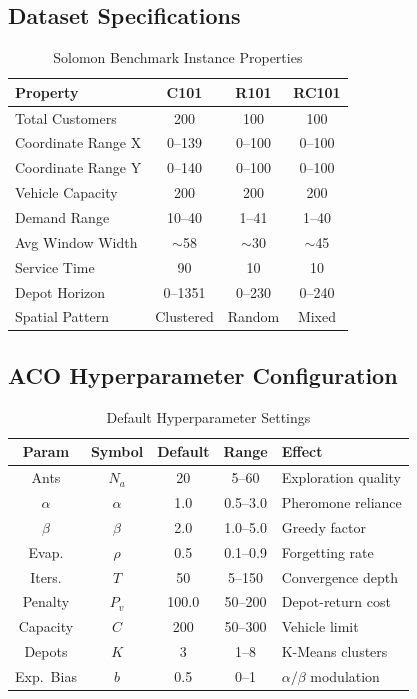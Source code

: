 \documentclass[10pt,conference]{IEEEtran}
\begin{document}
\subsection{Dataset Specifications}

\begin{table}[h]
\caption{Solomon Benchmark Instance Properties}
\label{tab:dataset_specs}
\begin{center}
\footnotesize
\begin{tabular}{|l|c|c|c|}
\hline
\textbf{Property} & \textbf{C101} & \textbf{R101} & \textbf{RC101} \\
\hline
Total Customers & 200 & 100 & 100 \\
Coordinate Range X & 0--139 & 0--100 & 0--100 \\
Coordinate Range Y & 0--140 & 0--100 & 0--100 \\
Vehicle Capacity & 200 & 200 & 200 \\
Demand Range & 10--40 & 1--41 & 1--40 \\
Avg Window Width & $\sim$58 & $\sim$30 & $\sim$45 \\
Service Time & 90 & 10 & 10 \\
Depot Horizon & 0--1351 & 0--230 & 0--240 \\
Spatial Pattern & Clustered & Random & Mixed \\
\hline
\end{tabular}
\end{center}
\end{table}

\subsection{ACO Hyperparameter Configuration}

\begin{table}[h]
\caption{Default Hyperparameter Settings}
\label{tab:hyperparams}
\begin{center}
\footnotesize
\begin{tabular}{|c|c|c|c|l|}
\hline
\textbf{Param} & \textbf{Symbol} & \textbf{Default} & \textbf{Range} & \textbf{Effect} \\
\hline
Ants & $N_a$ & 20 & 5--60 & Exploration quality \\
$\alpha$ & $\alpha$ & 1.0 & 0.5--3.0 & Pheromone reliance \\
$\beta$ & $\beta$ & 2.0 & 1.0--5.0 & Greedy factor \\
Evap. & $\rho$ & 0.5 & 0.1--0.9 & Forgetting rate \\
Iters. & $T$ & 50 & 5--150 & Convergence depth \\
Penalty & $P_v$ & 100.0 & 50--200 & Depot-return cost \\
Capacity & $C$ & 200 & 50--300 & Vehicle limit \\
Depots & $K$ & 3 & 1--8 & K-Means clusters \\
Exp.\ Bias & $b$ & 0.5 & 0--1 & $\alpha/\beta$ modulation \\
\hline
\end{tabular}
\end{center}
\end{table}
\end{document}
